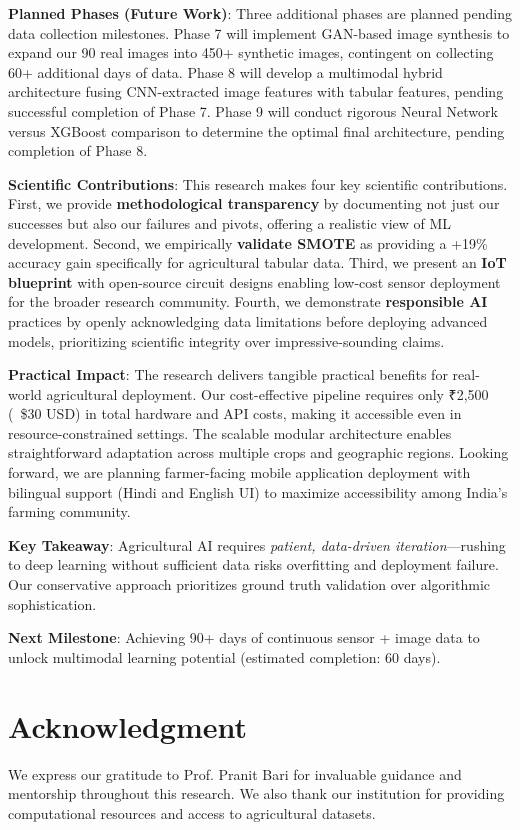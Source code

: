 \documentclass[10pt,twocolumn]{article}
\begin{document}
\textbf{Planned Phases (Future Work)}: Three additional phases are planned pending data collection milestones. Phase 7 will implement GAN-based image synthesis to expand our 90 real images into 450+ synthetic images, contingent on collecting 60+ additional days of data. Phase 8 will develop a multimodal hybrid architecture fusing CNN-extracted image features with tabular features, pending successful completion of Phase 7. Phase 9 will conduct rigorous Neural Network versus XGBoost comparison to determine the optimal final architecture, pending completion of Phase 8.

\textbf{Scientific Contributions}: This research makes four key scientific contributions. First, we provide \textbf{methodological transparency} by documenting not just our successes but also our failures and pivots, offering a realistic view of ML development. Second, we empirically \textbf{validate SMOTE} as providing a +19\% accuracy gain specifically for agricultural tabular data. Third, we present an \textbf{IoT blueprint} with open-source circuit designs enabling low-cost sensor deployment for the broader research community. Fourth, we demonstrate \textbf{responsible AI} practices by openly acknowledging data limitations before deploying advanced models, prioritizing scientific integrity over impressive-sounding claims.

\textbf{Practical Impact}: The research delivers tangible practical benefits for real-world agricultural deployment. Our cost-effective pipeline requires only ₹2,500 (~\$30 USD) in total hardware and API costs, making it accessible even in resource-constrained settings. The scalable modular architecture enables straightforward adaptation across multiple crops and geographic regions. Looking forward, we are planning farmer-facing mobile application deployment with bilingual support (Hindi and English UI) to maximize accessibility among India's farming community.

\textbf{Key Takeaway}: Agricultural AI requires \textit{patient, data-driven iteration}—rushing to deep learning without sufficient data risks overfitting and deployment failure. Our conservative approach prioritizes ground truth validation over algorithmic sophistication.

\textbf{Next Milestone}: Achieving 90+ days of continuous sensor + image data to unlock multimodal learning potential (estimated completion: 60 days).

\section*{Acknowledgment}
We express our gratitude to Prof. Pranit Bari for invaluable guidance and mentorship throughout this research. We also thank our institution for providing computational resources and access to agricultural datasets.
\end{document}
